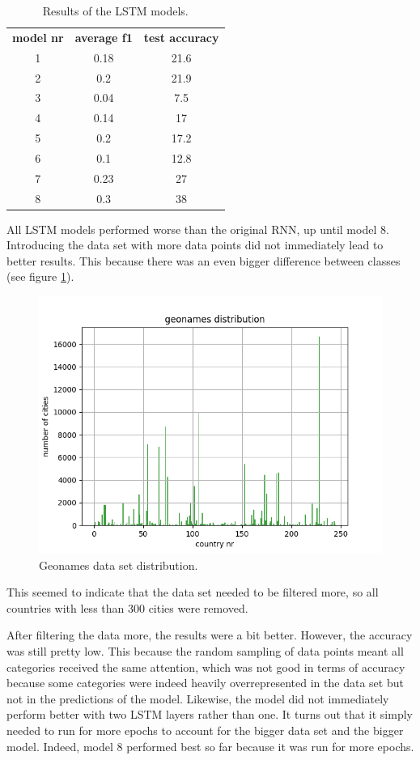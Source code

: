 \documentclass[runningheads]{llncs}
\begin{document}
\begin{table}[h!]
    \begin{center}
        \caption{Results of the LSTM models.}
        \label{tab:LSTM_models}
        \begin{tabularx}{.5\textwidth}{ | c | c | c |}
			\textbf{model nr} & \textbf{average f1} & \textbf{test accuracy} \\
			1 & 0.18 & 21.6 \\
			2 & 0.2  & 21.9 \\
			3 & 0.04 & 7.5 \\
			4 & 0.14 & 17 \\
			5 & 0.2  & 17.2 \\
			6 & 0.1  & 12.8 \\
			7 & 0.23 & 27 \\
			8 & 0.3  & 38 \\
         \end{tabularx}  
    \end{center}
\end{table}

       
All LSTM models performed worse than the original RNN, up until model 8. Introducing the data set with more data points did not immediately lead to better results. This because there was an even bigger difference between classes (see figure \ref{fig:geonames}). 

\begin{figure}[h!]
	\centering
	\includegraphics[width=.5\linewidth]{../plots/geonames_set.png}
	\caption{ Geonames data set distribution.}
	\label{fig:geonames}
\end{figure}

This seemed to indicate that the data set needed to be filtered more, so all countries with less than 300 cities were removed.

After filtering the data more, the results were a bit better. However, the accuracy was still pretty low. This because the random sampling of data points meant all categories received the same attention, which was not good in terms of accuracy because some categories were indeed heavily overrepresented in the data set but not in the predictions of the model.
Likewise, the model did not immediately perform better with two LSTM layers rather than one. It turns out that it simply needed to run for more epochs to account for the bigger data set and the bigger model. Indeed, model 8 performed best so far because it was run for more epochs.
 
\end{document}
